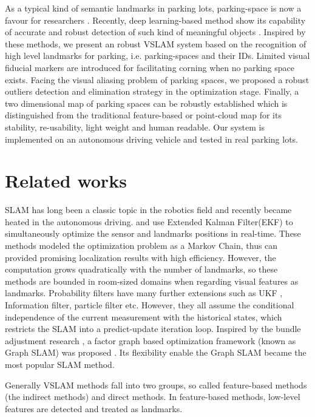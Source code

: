 \documentclass[journal]{IEEEtran}
\begin{document}
As a typical kind of semantic landmarks in parking lots, parking-space is now a favour for researchers
\citep{Houben:2015hq} \citep{Grimmett2015Integrating} \citep{Himstedt2017Online}.
Recently, deep learning-based method show its capability of  accurate and robust detection of such kind of meaningful objects \citep{zhanglin}. 
Inspired by these methods, we present an robust VSLAM system based on the recognition of high level landmarks for parking, i.e. parking-spaces and their IDs. 
Limited visual fiducial markers are introduced for facilitating corning when no parking space exists. 
Facing the visual aliasing problem of parking spaces, we proposed a robust outliers detection and elimination strategy in the optimization stage.
Finally, a two dimensional map of parking spaces can be robustly established which is distinguished from the traditional feature-based or point-cloud map for its stability, re-usability, light weight and human readable.
Our system is implemented on an autonomous driving vehicle and tested in real parking lots.

\section{Related works}
SLAM has long been a classic topic in the robotics field and recently became heated in the autonomous driving\citep{}. 
\citet{Davison2003Real} \citet{Davison2007MonoSLAM} and \citet{Civera20101} use Extended Kalman Filter(EKF) to simultaneously optimize the sensor and landmarks positions in real-time. 
These methods modeled the optimization problem as a Markov Chain, thus can provided promising localization results with high efficiency.
However, the computation grows quadratically with the number of landmarks\cite{Bailey2006Simultaneous}, so these methods are bounded in room-sized domains when regarding visual features as landmarks.
Probability filters have many further extensions such as UKF \citep{}, Information filter\citep{}, particle filter\citep{} etc.
However, they all assume the conditional independence of the current measurement with the historical states, which restricts the SLAM into a predict-update iteration loop.
Inspired by the bundle adjustment research \citep{}, a factor graph based optimization framework (known as Graph SLAM) was proposed \citep{}.
Its flexibility enable the Graph SLAM became the most popular SLAM method.  

Generally VSLAM methods fall into two groups, so called feature-based methods (the indirect methods) and direct methods. 
In feature-based methods, low-level features are detected and treated as landmarks. 
\end{document}
